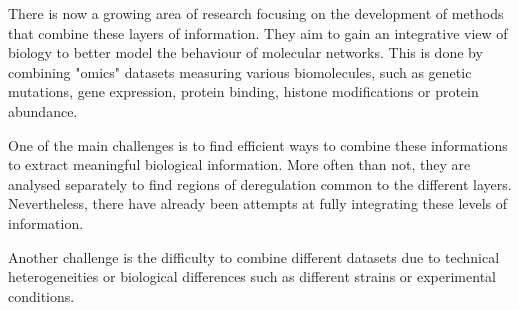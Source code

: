 There is now a growing area of research focusing on the development of methods that combine these layers of information. They aim to gain an integrative view of biology to better model the behaviour of molecular networks. This is done by combining "omics" datasets measuring various biomolecules, such as genetic mutations, gene expression, protein binding, histone modifications or protein abundance.

One of the main challenges is to find efficient ways to combine these informations to extract meaningful biological information. More often than not, they are analysed separately to find regions of deregulation common to the different layers. Nevertheless, there have already been attempts at fully integrating these levels of information. %

Another challenge is the difficulty to combine different datasets due to technical heterogeneities or biological differences such as different strains or experimental conditions.
